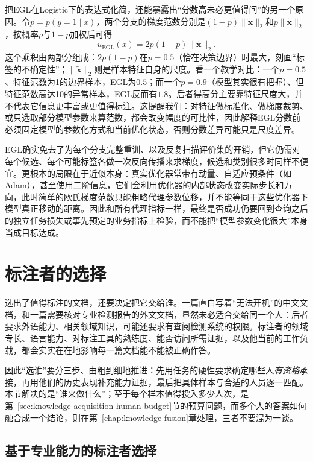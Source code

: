 把EGL在Logistic下的表达式化简，还能暴露出“分数高未必更值得问”的另一个原因。令$p=p(y=1\mid x)$，两个分支的梯度范数分别是$(1-p)\lVert\widetilde{\bm{x}}\rVert_2$和$p\lVert\widetilde{\bm{x}}\rVert_2$，按概率$p$与$1-p$加权后可得
\[
  u_{\mathrm{EGL}}(x)=2p(1-p)\lVert\widetilde{\bm{x}}\rVert_2.
\]
这个乘积由两部分组成：$2p(1-p)$在$p=0.5$（恰在决策边界）时最大，刻画“标签的不确定性”；$\lVert\widetilde{\bm{x}}\rVert_2$则是样本特征自身的尺度。看一个教学对比：一个$p=0.5$、特征范数为1的边界样本，EGL为$0.5$；而一个$p=0.9$（模型其实很有把握）、但特征范数高达10的异常样本，EGL反而有$1.8$。后者得高分主要靠特征尺度大，并不代表它信息更丰富或更值得标注。这提醒我们：对特征做标准化、做梯度裁剪、或只选取部分模型参数来算范数，都会改变幅度的可比性，因此解释EGL分数前必须固定模型的参数化方式和当前优化状态，否则分数差异可能只是尺度差异。

EGL确实免去了为每个分支完整重训、以及反复扫描评价集的开销，但它仍需对每个候选、每个可能标签各做一次反向传播来求梯度，候选和类别很多时同样不便宜。更根本的局限在于近似本身：真实优化器常带有动量、自适应预条件（如Adam），甚至使用二阶信息，它们会利用优化器的内部状态改变实际步长和方向，此时简单的欧氏梯度范数只能粗略代理参数位移，并不能等同于这些优化器下模型真正移动的距离。因此和所有代理指标一样，最终是否成功仍要回到查询之后的独立任务损失或事先预定的业务指标上检验，而不能把“模型参数变化很大”本身当成目标达成。

\section{标注者的选择}
\label{sec:knowledge-acquisition-human-annotator-selection}

选出了值得标注的文档，还要决定把它交给谁。一篇直白写着“无法开机”的中文文档，和一篇需要核对专业检测报告的外文文档，显然未必适合交给同一个人：后者要求外语能力、相关领域知识，可能还要求有查阅检测系统的权限。标注者的领域专长、语言能力、对标注工具的熟练度、能否访问所需证据，以及他当前的工作负载，都会实实在在地影响每一篇文档能不能被正确作答。

因此“选谁”要分三步、由粗到细地推进：先用任务的硬性要求确定哪些人\emph{有资格}承接，再用他们的历史表现补充能力证据，最后把具体样本与合适的人员逐一匹配。本节解决的是“谁来做什么”；至于每个样本值得投入多少人次，是第~\ref{sec:knowledge-acquisition-human-budget}节的预算问题，而多个人的答案如何融合成一个结论，则在第~\ref{chap:knowledge-fusion}章处理，三者不要混为一谈。

\subsection{基于专业能力的标注者选择}
\label{sec:knowledge-acquisition-human-expertise-selection}

